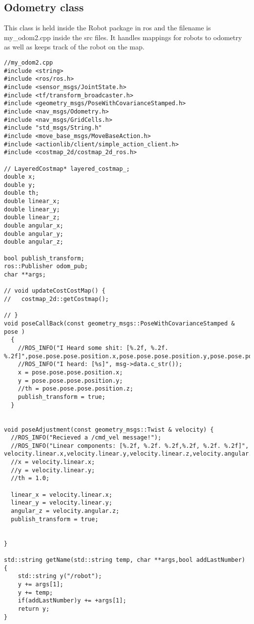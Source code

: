 \subsection{Odometry class}
This class is held inside the Robot package in ros and the filename is my\_odom2.cpp inside the src files. It handles mappings for robots to odometry as well as keeps track of the robot on the map.
\begin{lstlisting}
//my_odom2.cpp
#include <string>
#include <ros/ros.h>
#include <sensor_msgs/JointState.h>
#include <tf/transform_broadcaster.h>
#include <geometry_msgs/PoseWithCovarianceStamped.h>
#include <nav_msgs/Odometry.h>
#include <nav_msgs/GridCells.h>
#include "std_msgs/String.h"
#include <move_base_msgs/MoveBaseAction.h>
#include <actionlib/client/simple_action_client.h>
#include <costmap_2d/costmap_2d_ros.h>

// LayeredCostmap* layered_costmap_;
double x;
double y;
double th;
double linear_x;
double linear_y;
double linear_z;
double angular_x;
double angular_y;
double angular_z;

bool publish_transform;
ros::Publisher odom_pub;
char **args;

// void updateCostCostMap() {
//   costmap_2d::getCostmap();

// }
void poseCallBack(const geometry_msgs::PoseWithCovarianceStamped & pose )
  {
    //ROS_INFO("I Heard some shit: [%.2f, %.2f. %.2f]",pose.pose.pose.position.x,pose.pose.pose.position.y,pose.pose.pose.position.z);
    //ROS_INFO("I heard: [%s]", msg->data.c_str());
    x = pose.pose.pose.position.x;
    y = pose.pose.pose.position.y;
    //th = pose.pose.pose.position.z;
    publish_transform = true;
  }


void poseAdjustment(const geometry_msgs::Twist & velocity) {
  //ROS_INFO("Recieved a /cmd_vel message!");
  //ROS_INFO("Linear components: [%.2f, %.2f. %.2f,%.2f, %.2f. %.2f]", velocity.linear.x,velocity.linear.y,velocity.linear.z,velocity.angular.x,velocity.angular.y,velocity.angular.z);
  //x = velocity.linear.x;
  //y = velocity.linear.y;
  //th = 1.0;

  linear_x = velocity.linear.x;
  linear_y = velocity.linear.y;
  angular_z = velocity.angular.z;
  publish_transform = true;


}

std::string getName(std::string temp, char **args,bool addLastNumber) {
    std::string y("/robot");
    y += args[1];
    y += temp;
    if(addLastNumber)y += +args[1];
    return y;
}


\end{lstlisting}
